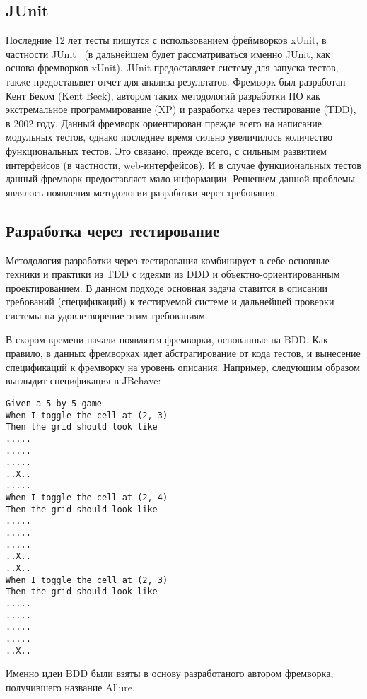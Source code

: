\subsection{JUnit}

Последние 12 лет тесты пишутся с использованием фреймворков xUnit, в частности JUnit~\cite{ipl_cite} (в дальнейшем будет рассматриваться именно JUnit, как основа фремворков xUnit). JUnit предоставляет систему для запуска тестов, также предоставляет отчет для анализа результатов. 
Фремворк был разработан Кент Беком (Kent Beck), автором таких методологий разработки ПО как экстремальное программирование (XP) и разработка через тестирование (TDD), в 2002 году. 
Данный фремворк ориентирован прежде всего на написание модульных тестов, однако последнее время сильно увеличилось количество функциональных тестов. Это связано, прежде всего, с сильным развитием интерфейсов (в частности, web-интерфейсов). И в случае функциональных тестов данный фремворк предоставляет мало информации. Решением данной проблемы являлось появления методологии разработки через требования.

\subsection{Разработка через тестирование}

Методология разработки через тестирования комбинирует в себе основные техники и практики из TDD с идеями из DDD и объектно-ориентированным проектированием. В данном подходе основная задача ставится в описании требований (спецификаций) к тестируемой системе и дальнейшей проверки системы на удовлетворение этим требованиям. 

В скором времени начали появлятся фремворки, основанные на BDD. Как правило, в данных фремворках идет абстрагирование от кода тестов, и вынесение спецификаций к фремворку на уровень описания. Например, следующим образом выглыдит спецификация в JBehave:

\begin{lstlisting}
Given a 5 by 5 game
When I toggle the cell at (2, 3)
Then the grid should look like
.....
.....
.....
..X..
.....
When I toggle the cell at (2, 4)
Then the grid should look like
.....
.....
.....
..X..
..X..
When I toggle the cell at (2, 3)
Then the grid should look like
.....
.....
.....
.....
..X..
\end{lstlisting}

Именно идеи BDD были взяты в основу разработаного автором фремворка, получившего название Allure.

